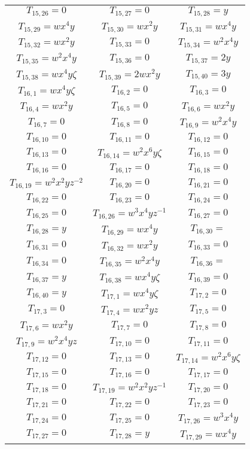 \documentclass[12pt]{memoireuqam1.3}
\begin{document}
\begin{longtable}{|c|c|c|}
$T_{15,26}= 0$&
$T_{15,27}= 0$&
$T_{15,28}= y$\\
$T_{15,29}= wx^4y$&
$T_{15,30}= wx^2y$&
$T_{15,31}= wx^4y$\\
$T_{15,32}= wx^2y$&
$T_{15,33}= 0$&
$T_{15,34}= w^2x^4y$\\
$T_{15,35}= w^2x^4y$&
$T_{15,36}= 0$&
$T_{15,37}= 2y$\\
$T_{15,38}= wx^4y\zeta$&
$T_{15,39}= 2wx^2y$&
$T_{15,40}= 3y$\\
$T_{16,1}= wx^4y\zeta$&
$T_{16,2}= 0$&
$T_{16,3}= 0$\\
$T_{16,4}= wx^2y$&
$T_{16,5}= 0$&
$T_{16,6}= wx^2y$\\
$T_{16,7}= 0$&
$T_{16,8}= 0$&
$T_{16,9}= w^2x^4y$\\
$T_{16,10}= 0$&
$T_{16,11}= 0$&
$T_{16,12}= 0$\\
$T_{16,13}= 0$&
$T_{16,14}= w^2x^6y\zeta$&
$T_{16,15}= 0$\\
$T_{16,16}= 0$&
$T_{16,17}= 0$&
$T_{16,18}= 0$\\
$T_{16,19}= w^2x^2yz^{-2}$&
$T_{16,20}= 0$&
$T_{16,21}= 0$\\
$T_{16,22}= 0$&
$T_{16,23}= 0$&
$T_{16,24}= 0$\\
$T_{16,25}= 0$&
$T_{16,26}= w^3x^4yz^{-1}$&
$T_{16,27}= 0$\\
$T_{16,28}= y$&
$T_{16,29}= wx^4y$&
$T_{16,30}= $\\
$T_{16,31}= 0$&
$T_{16,32}= wx^2y$&
$T_{16,33}= 0$\\
$T_{16,34}= 0$&
$T_{16,35}= w^2x^4y$&
$T_{16,36}= $\\
$T_{16,37}= y$&
$T_{16,38}= wx^4y\zeta$&
$T_{16,39}= 0$\\
$T_{16,40}= y$&
$T_{17,1}= wx^4y\zeta$&
$T_{17,2}= 0$\\
$T_{17,3}= 0$&
$T_{17,4}= wx^2yz$&
$T_{17,5}= 0$\\
$T_{17,6}= wx^2y$&
$T_{17,7}= 0$&
$T_{17,8}= 0$\\
$T_{17,9}= w^2x^4yz$&
$T_{17,10}= 0$&
$T_{17,11}= 0$\\
$T_{17,12}= 0$&
$T_{17,13}= 0$&
$T_{17,14}= w^2x^6y\zeta$\\
$T_{17,15}= 0$&
$T_{17,16}= 0$&
$T_{17,17}= 0$\\
$T_{17,18}= 0$&
$T_{17,19}= w^2x^2yz^{-1}$&
$T_{17,20}= 0$\\
$T_{17,21}= 0$&
$T_{17,22}= 0$&
$T_{17,23}= 0$\\
$T_{17,24}= 0$&
$T_{17,25}= 0$&
$T_{17,26}= w^3x^4y$\\
$T_{17,27}= 0$&
$T_{17,28}= y$&
$T_{17,29}= wx^4y$\\

\end{longtable}
\end{document}
